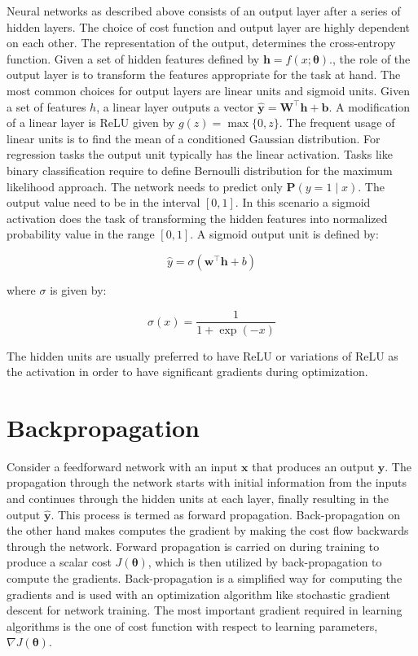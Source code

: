 Neural networks as described above consists of an output layer after a series of hidden layers. The choice of cost function and output layer are highly dependent on each other. The representation of the output, determines the cross-entropy function. Given a set of hidden features defined by $\boldsymbol{h} = f(x;\boldsymbol{\theta}).$, the role of the output layer is to transform the features appropriate for the task at hand. The most common choices for output layers are linear units and sigmoid units. Given a set of features $h$, a linear layer outputs a vector $\hat{\boldsymbol{y}}=\boldsymbol{W}^{\top} \boldsymbol{h}+\boldsymbol{b}$. A modification of a linear layer is \acf{ReLU} given by $g(z)=\max \{0, z\}$. The frequent usage of linear units is to find the mean of a conditioned Gaussian distribution. For regression tasks the output unit typically has the linear activation. Tasks like binary classification require to define Bernoulli distribution for the maximum likelihood approach. The network needs to predict only $\boldsymbol{P}(y=1 \mid x)$. The output value need to be in the interval $[0,1]$. In this scenario a sigmoid activation does the task of transforming the hidden features into normalized probability value in the range $[0,1]$. A sigmoid output unit is defined by:

   
\begin{equation}
\hat{y}=\sigma\left(\boldsymbol{w}^{\top} \boldsymbol{h}+b\right)
\end{equation}

where $\sigma$ is given by:

\begin{equation}
\sigma(x)=\frac{1}{1+\exp (-x)}
\end{equation}

The hidden units are usually preferred to have \ac{ReLU} or variations of \ac{ReLU} as the activation in order to have significant gradients during optimization. 

\section{Backpropagation}

Consider a feedforward network with an input $\boldsymbol{x}$ that produces an output $\boldsymbol{y}$. The propagation through the network starts with initial information from the inputs and continues through the hidden units at each layer, finally resulting in the output $\hat{\boldsymbol{y}}$. This process is termed as forward propagation. Back-propagation on the other hand makes computes the gradient by making the cost flow backwards through the network. Forward propagation is carried on during training to produce a scalar cost $J(\boldsymbol{\theta})$, which is then utilized by back-propagation to compute the gradients. Back-propagation is a simplified way for computing the gradients and is used with an optimization algorithm like stochastic gradient descent for network training. The most important gradient required in learning algorithms is the one of cost function with respect to learning parameters, $\nabla J(\boldsymbol{\theta})$. 

